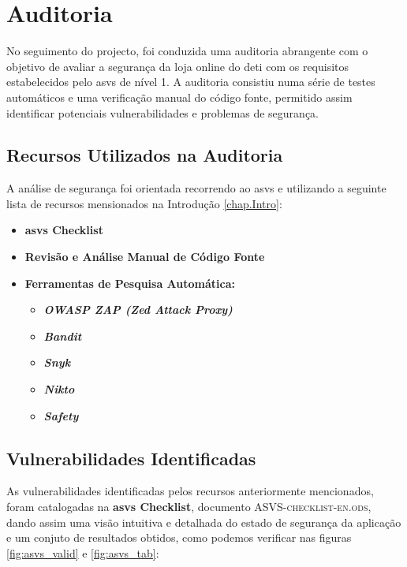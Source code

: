 %
%
\chapter{Auditoria}
\label{chap.Auditoria}

No seguimento do projecto, foi conduzida uma auditoria abrangente com o objetivo de avaliar a segurança da loja online do \ac{deti} com os requisitos estabelecidos pelo \ac{asvs} de nível 1. A auditoria consistiu numa série de testes automáticos e uma verificação manual do código fonte, permitido assim identificar potenciais vulnerabilidades e problemas de segurança.

\section{Recursos Utilizados na Auditoria}

A análise de segurança foi orientada recorrendo ao \ac{asvs} e utilizando a seguinte lista de recursos mensionados na Introdução \ref{chap.Intro}:

\begin{itemize}
    \item \textbf{\ac{asvs} Checklist}
    \item \textbf{Revisão e Análise Manual de Código Fonte}
    \item \textbf{Ferramentas de Pesquisa Automática:}
        \begin{itemize}
            \item \textbf{\textit{OWASP ZAP (Zed Attack Proxy)}}
            \item \textbf{\textit{Bandit}}
            \item \textbf{\textit{Snyk}}
            \item \textbf{\textit{Nikto}}
            \item \textbf{\textit{Safety}}
        \end{itemize}
\end{itemize}

\section{Vulnerabilidades Identificadas}

As vulnerabilidades identificadas pelos recursos anteriormente mencionados, foram catalogadas na \textbf{\ac{asvs} Checklist}, documento \textsc{ASVS-checklist-en.ods}, dando assim uma visão intuitiva e detalhada do estado de segurança da aplicação e um conjuto de resultados obtidos, como podemos verificar nas figuras \ref{fig:asvs_valid} e \ref{fig:asvs_tab}:


